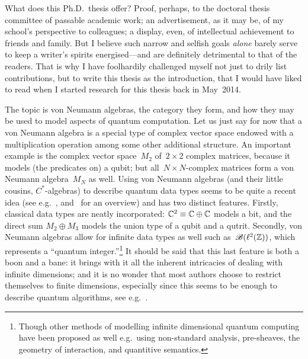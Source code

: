 \documentclass[b5paper]{book}
\begin{document}
\begin{parsec}{10}
\begin{point}{10}
What does this Ph.D.~thesis offer?
Proof, perhaps,
to the doctoral thesis committee
of passable academic work;
an advertisement, as it may be,
of my school's perspective
to colleagues;
a display, even,
of intellectual achievement
to friends and family.
But I believe such narrow and selfish goals \emph{alone}
barely serve to keep a writer's spirits 
energised---and are definitely detrimental to that of the readers.
That is why I have foolhardily
challenged
myself
not just 
to drily list contributions,
but to write this thesis 
as the introduction,
that I would have liked to read
when I started
research for this thesis
back in May~2014.

The topic is von Neumann algebras,
the category they form,
and how they may be used
to model aspects of quantum computation.
Let us just say for now that a von Neumann algebra
is a special type of complex vector
space endowed with
a multiplication operation among some other additional structure.
An important example is the complex vector space~$M_2$
of~$2\times 2$ complex matrices,
because it models (the predicates on) a qubit;
but all~$N\times N$-complex matrices form a von Neumann algebra~$M_N$ as well.
Using von Neumann algebras
(and their little cousins, $C^*$-algebras) 
to describe quantum data types 
seems to be quite a recent idea
(see e.g.~\cite{jacobs2013block,rennela2015operator,furber2013kleisli}, 
	and~\cite{cho2016semantics} for an overview)
and has two distinct features.
Firstly, classical data types
are neatly incorporated:
$\mathbb{C}^2 \equiv \mathbb{C}\oplus \mathbb{C}$
models a bit,
and the direct sum $M_2\oplus M_3$
models the union type of a qubit and a qutrit.
Secondly,
von Neumann algebras
allow for infinite data types as well
	such as~$\mathscr{B}(\ell^2(\mathbb{Z}))$,
which represents a ``quantum integer.''\footnote{Though
	other methods of modelling infinite dimensional
	quantum computing have been proposed as well
	e.g.~using non-standard analysis\cite{Gogioso2017},
	pre-sheaves\cite{malherbe2013categorical},
	the geometry of interaction\cite{hasuo2017semantics},
	and quantitive semantics\cite{pagani2014applying}.}
It should be said that this last feature
is both a boon and a bane:
it brings with it all the inherent
intricacies of dealing with infinite dimensions;
and it is no wonder that
most authors choose 
to restrict themselves
to finite dimensions,
especially since
this seems to be enough to describe quantum algorithms,
see e.g.~\cite{nielsen2002quantum}.
\end{point}

\end{parsec}
\end{document}
